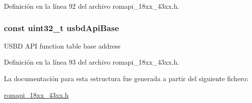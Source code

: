 Definición en la línea 92 del archivo romapi\+\_\+18xx\+\_\+43xx.\+h.

\subsubsection[{\texorpdfstring{usbd\+Api\+Base}{usbdApiBase}}]{\setlength{\rightskip}{0pt plus 5cm}const uint32\+\_\+t usbd\+Api\+Base}\hypertarget{struct_l_p_c___r_o_m___a_p_i___t_a283da22255e47638afbbb7e8e0cef150}{}\label{struct_l_p_c___r_o_m___a_p_i___t_a283da22255e47638afbbb7e8e0cef150}
U\+S\+BD A\+PI function table base address 

Definición en la línea 93 del archivo romapi\+\_\+18xx\+\_\+43xx.\+h.



La documentación para esta estructura fue generada a partir del siguiente fichero\+:\begin{DoxyCompactItemize}
\item 
\hyperlink{romapi__18xx__43xx_8h}{romapi\+\_\+18xx\+\_\+43xx.\+h}\end{DoxyCompactItemize}
